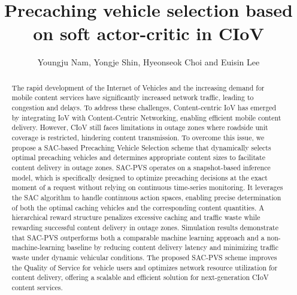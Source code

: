 \documentclass{aims}
\numberwithin{equation}{section}
\begin{document}
\title{Precaching vehicle selection based on soft actor-critic in CIoV}

\author{%
  Youngju Nam,
  Yongje Shin,
  Hyeonseok Choi
  and
  Euisin Lee\corrauth
}


\address{%
  }


\begin{abstract}
The rapid development of the Internet of Vehicles and the increasing demand for mobile content services have significantly increased network traffic, leading to congestion and delays. To address these challenges, Content-centric IoV has emerged by integrating IoV with Content-Centric Networking, enabling efficient mobile content delivery. However, CIoV still faces limitations in outage zones where roadside unit coverage is restricted, hindering content transmission. To overcome this issue, we propose a SAC-based Precaching Vehicle Selection scheme that dynamically selects optimal precaching vehicles and determines appropriate content sizes to facilitate content delivery in outage zones. SAC-PVS operates on a snapshot-based inference model, which is specifically designed to optimize precaching decisions at the exact moment of a request without relying on continuous time-series monitoring. It leverages the SAC algorithm to handle continuous action spaces, enabling precise determination of both the optimal caching vehicles and the corresponding content quantities. A hierarchical reward structure penalizes excessive caching and traffic waste while rewarding successful content delivery in outage zones. Simulation results demonstrate that SAC-PVS outperforms both a comparable machine learning approach and a non-machine-learning baseline by reducing content delivery latency and minimizing traffic waste under dynamic vehicular conditions. The proposed SAC-PVS scheme improves the Quality of Service for vehicle users and optimizes network resource utilization for content delivery, offering a scalable and efficient solution for next-generation CIoV content services.
\end{abstract}
\end{document}
